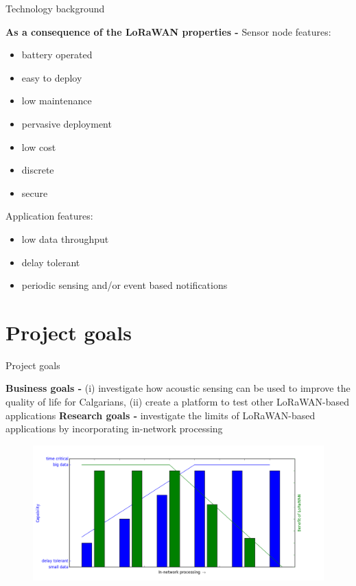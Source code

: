 \documentclass{beamer}
\begin{document}
    \begin{frame}{Technology background}
        
        {\bf As a consequence of the LoRaWAN properties -}
        \vfill 
        Sensor node features:
        \begin{itemize}
            \item battery operated 
            \item easy to deploy
            \item low maintenance
            \item pervasive deployment
            \item low cost
            \item discrete
            \item secure
        \end{itemize}
        \vfill 
        Application features:
        \begin{itemize}
            \item low data throughput 
            \item delay tolerant
            \item periodic sensing and/or event based notifications
        \end{itemize}
        
    \end{frame}

\section{Project goals}

    \begin{frame}{Project goals}
    
        {\bf Business goals -} (i) investigate how acoustic sensing can be used to improve the quality of life for Calgarians, (ii) create a platform to test other LoRaWAN-based applications
        \vfill 
        {\bf Research goals -} investigate the limits of LoRaWAN-based applications by incorporating \alert{in-network processing}
        \vfill
        \begin{center}
            \begin{figure}
                \includegraphics[scale=0.31]{figures/figure_1.png}
            \end{figure}
        \end{center}
        
    \end{frame}
\end{document}
